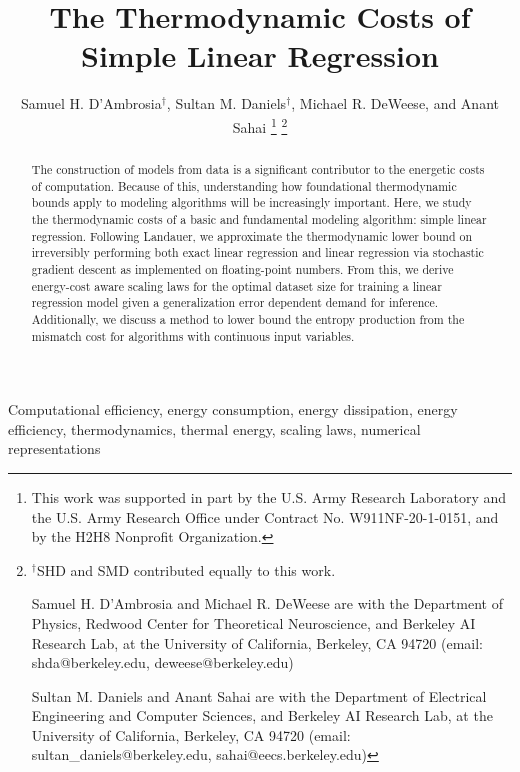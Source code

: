 \documentclass[12pt,onecolumn, margin=1in]{IEEEtran}
\begin{document}
\title{The Thermodynamic Costs of Simple Linear Regression}
\author{



Samuel H. D'Ambrosia$^\dagger$, Sultan M. Daniels$^\dagger$, Michael R. DeWeese, and Anant Sahai
\thanks{This work was supported in part by the U.S. Army Research Laboratory and the U.S. Army Research Office under Contract No. W911NF-20-1-0151, and by the H2H8 Nonprofit Organization.

}
\thanks{
$^\dagger$SHD and SMD contributed equally to this work.


Samuel H. D'Ambrosia and Michael R. DeWeese are with the Department of Physics, Redwood Center for Theoretical Neuroscience, and Berkeley AI Research Lab, at the University of California, Berkeley, CA 94720 (email: shda@berkeley.edu, deweese@berkeley.edu)

Sultan M. Daniels and Anant Sahai are with the Department of Electrical Engineering and Computer Sciences, and Berkeley AI Research Lab, at the University of California, Berkeley, CA 94720 (email: sultan\_daniels@berkeley.edu, sahai@eecs.berkeley.edu)

}
}

\maketitle

\begin{abstract}
    The construction of models from data is a significant contributor to the energetic costs of computation. Because of this, understanding how foundational thermodynamic bounds apply to modeling algorithms will be increasingly important. Here, we study the thermodynamic costs of a basic and fundamental modeling algorithm: simple linear regression. Following Landauer, we approximate the thermodynamic lower bound on irreversibly performing both exact linear regression and linear regression via stochastic gradient descent as implemented on floating-point numbers. From this, we derive energy-cost aware scaling laws for the optimal dataset size for training a linear regression model given a generalization error dependent demand for inference. Additionally, we discuss a method to lower bound the entropy production from the mismatch cost for algorithms with continuous input variables. 
\end{abstract}

\begin{IEEEkeywords}

Computational efficiency, energy consumption, energy dissipation, energy efficiency, thermodynamics, thermal energy, scaling laws, numerical representations

\end{IEEEkeywords}
\end{document}
